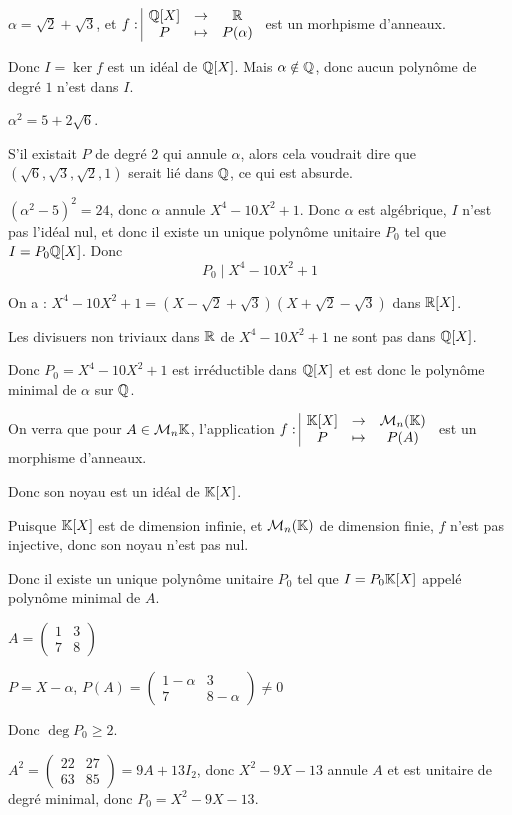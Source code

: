 \begin{exemple}
    $\alpha = \sqrt 2 + \sqrt 3$, et $f: \space \begin{array}{|ccc} \displaystyle \mathbb{Q}[X] & \to & \displaystyle \mathbb{R} \\ \displaystyle P & \mapsto & \displaystyle P(\alpha) \end{array}$ est un morhpisme d'anneaux.

    Donc $I = \ker f$ est un idéal de $\mathbb{Q}[X]$. Mais $\alpha \notin \mathbb{Q}$, donc aucun 
    polynôme de degré $1$ n'est dans $I$.

    $\alpha^2 = 5 + 2 \sqrt 6$. 

    S'il existait $P$ de degré 2 qui annule $\alpha$, alors cela voudrait dire que 
    $(\sqrt 6, \sqrt 3, \sqrt 2, 1)$ serait lié dans $\mathbb{Q}$, ce qui est absurde. 

    $(\alpha^2 - 5)^2 = 24$, donc $\alpha$ annule $X^4 - 10 X^2 + 1$. Donc $\alpha$ est algébrique, 
    $I$ n'est pas l'idéal nul, et donc il existe un unique polynôme unitaire $P_0$ tel que
    $I = P_0 \mathbb{Q}[X]$.
    Donc $$P_0 \mid X^4 - 10 X^2 + 1$$

    On a : $X^4 - 10 X^2 + 1 = (X - \sqrt 2 + \sqrt 3)(X + \sqrt 2 - \sqrt 3)$ dans $\mathbb{R}[X]$.

    Les divisuers non triviaux dans $\mathbb{R}$ de $X^4 - 10 X^2 + 1$ ne sont pas dans $\mathbb{Q}[X]$.

    Donc $P_0 = X^4 - 10 X^2 + 1$ est irréductible dans $\mathbb{Q}[X]$ et est donc le polynôme minimal de
    $\alpha$ sur $\mathbb{Q}$.
\end{exemple}

\begin{exemple}
    On verra que pour $A \in \mathcal M_n{\mathbb{K}}$, l'application $f: \space \begin{array}{|ccc} \displaystyle \mathbb{K}[X] & \to & \displaystyle \mathcal M_n(\mathbb{K}) \\ \displaystyle P & \mapsto & \displaystyle P(A) \end{array}$ est un morphisme d'anneaux.

    Donc son noyau est un idéal de $\mathbb{K}[X]$.

    Puisque $\mathbb{K}[X]$ est de dimension infinie, et $\mathcal M_n(\mathbb{K})$ de dimension finie,
    $f$ n'est pas injective, donc son noyau n'est pas nul.

    Donc il existe un unique polynôme unitaire $P_0$ tel que $I = P_0 \mathbb{K}[X]$ appelé polynôme
    minimal de $A$.

    \avspace $A = \begin{pmatrix}
        1 & 3 \\
        7 & 8
    \end{pmatrix}$

    $P = X - \alpha$, $P(A) = \begin{pmatrix}
        1 - \alpha & 3 \\
        7 & 8 - \alpha
    \end{pmatrix} \neq 0 $

    Donc $\deg P_0 \geqslant 2$.

    $A^2 = \begin{pmatrix}
        22 & 27 \\
        63 & 85
    \end{pmatrix} = 9A + 13 I_2$, donc $X^2 - 9X - 13$ annule $A$ et est unitaire de degré minimal, 
    donc $P_0 = X^2 - 9X - 13$.


\end{exemple}


